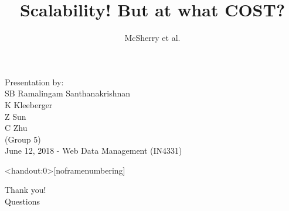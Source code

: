 \documentclass{beamer}
\title[]{Scalability! But at what COST?}
\author{McSherry et al.}
\date{}
\begin{document}
\begin{frame}[noframenumbering]
  \maketitle
  \vspace{2.25cm}
  \scriptsize{Presentation by:} \\
  \normalsize{
    SB Ramalingam Santhanakrishnan \\
    K Kleeberger \\
    Z Sun \\
    C Zhu \\
    (Group 5)\\
  }
  \vspace{0.6cm}
  \scriptsize{June 12, 2018 - Web Data Management (IN4331)}

\end{frame}











\begin{frame}<handout:0>[noframenumbering]
  \begin{center}
    \huge{Thank you!} \\
    \vspace{1.5cm}
    \large{Questions}
  \end{center}
\end{frame}
\end{document}
